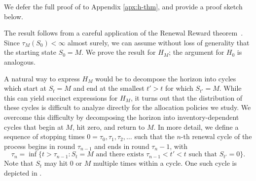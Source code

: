 \documentclass[mnsc,nonblindrev]{informs3}
\renewenvironment{proof}[1][Proof]{%
  \par\noindent{\itshape #1.} \ignorespaces
}{%
  \hfill\Halmos\par
}
\begin{document}
We defer the full proof of  to Appendix \ref{apx:h-thm}, and provide a proof sketch below.

\begin{proof}[Proof sketch] The result follows from a careful application of the Renewal Reward theorem~\citep[Chapter 10]{grimmett2020probability}. 
Since $\tau_M(S_0) < \infty$ almost surely, we can assume without loss of generality that the starting state $S_0 = M$.  We prove the result for $H_M$; the argument for $H_0$ is analogous.

A natural way to express $H_M$ would be to decompose the horizon into cycles which start at $S_t = M$ and end at the smallest $t' > t$ for which $S_{t'} = M$. While this can yield succinct expressions for $H_M$, it turns out that the distribution of these cycles is difficult to analyze directly for the allocation policies we study. We overcome this difficulty by decomposing the horizon into inventory-dependent cycles that begin at $M$, hit zero, and return to $M$.
In more detail, we define a sequence of stopping times $0 = \tau_0,\tau_1,\tau_2,\ldots$ such that the $n$-th renewal cycle of the process begins in round $\tau_{n-1}$ and ends in round $\tau_n-1$, with
\[\tau_n = \inf\{t > \tau_{n-1}: S_t = M \text{ and there exists } \tau_{n-1} < t' < t \text{ such that } S_{t'} = 0\}.\]
Note that $S_t$ may hit 0 or $M$ multiple times within a cycle. One such cycle is depicted in .


\begin{figure}[t]
\centering
{}
\end{figure}
\end{proof}
\end{document}

